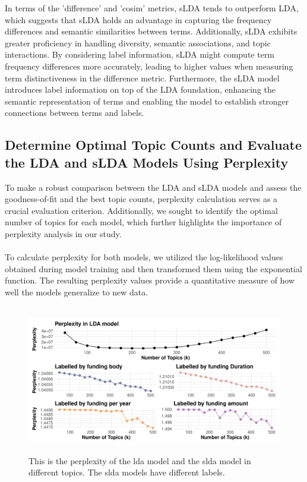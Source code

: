 \documentclass[12pt,twoside]{article}
\begin{document}
In terms of the 'difference' and 'cosim' metrics, sLDA tends to outperform LDA, which suggests that sLDA holds an advantage in capturing the frequency differences and semantic similarities between terms. Additionally, sLDA exhibits greater proficiency in handling diversity, semantic associations, and topic interactions. By considering label information, sLDA might compute term frequency differences more accurately, leading to higher values when measuring term distinctiveness in the difference metric. Furthermore, the sLDA model introduces label information on top of the LDA foundation, enhancing the semantic representation of terms and enabling the model to establish stronger connections between terms and labels.


\subsection{Determine Optimal Topic Counts and Evaluate the LDA and sLDA Models Using Perplexity}

To make a robust comparison between the LDA and sLDA models and assess the goodness-of-fit and the best topic counts, perplexity calculation serves as a crucial evaluation criterion. Additionally, we sought to identify the optimal number of topics for each model, which further highlights the importance of perplexity analysis in our study.\\\\

To calculate perplexity for both models, we utilized the log-likelihood values obtained during model training and then transformed them using the exponential function. The resulting perplexity values provide a quantitative measure of how well the models generalize to new data.\\\\

\begin{figure}[h]
    \centering
    \includegraphics[width=15cm]{./figures/lda-slda}\\[0.2cm] 
    \caption{This is the perplexity of the lda model and the slda model in different topics. The slda models have different labels.}

\end{figure}
\end{document}
